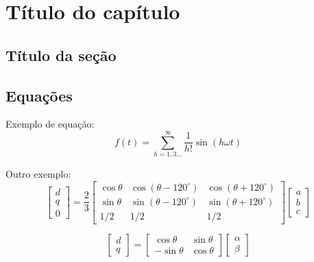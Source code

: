 \chapter{Título do capítulo}
\lipsum[1-2]

\section{Título da seção}
\lipsum[3-5]
%

\section{Equações}
Exemplo de equação:
    $$
    f(t) = \sum_{h=1,3\ldots}^\infty \dfrac{1}{h!} \sin(h \omega t)
    $$

Outro exemplo:
\begin{equation}
    \begin{bmatrix}
        d \\
        q \\
        0
    \end{bmatrix}
    =
    \frac{2}{3}
    \begin{bmatrix}
        \cos\theta & \cos(\theta - 120^\circ) & \cos(\theta + 120^\circ) \\
        \sin\theta & \sin(\theta - 120^\circ) & \sin(\theta + 120^\circ) \\
        1/2 & 1/2 & 1/2
    \end{bmatrix}
    \begin{bmatrix}
        a \\
        b \\
        c
    \end{bmatrix}
    \label{eq:abs_dq0}
\end{equation}

\begin{equation}
    \begin{bmatrix}
        d \\
        q
    \end{bmatrix}
    =
    \begin{bmatrix}
        \cos\theta & \sin\theta \\
        -\sin\theta & \cos\theta
    \end{bmatrix}
    \begin{bmatrix}
        \alpha \\
        \beta
    \end{bmatrix}
    \label{eq:parke}
\end{equation}




